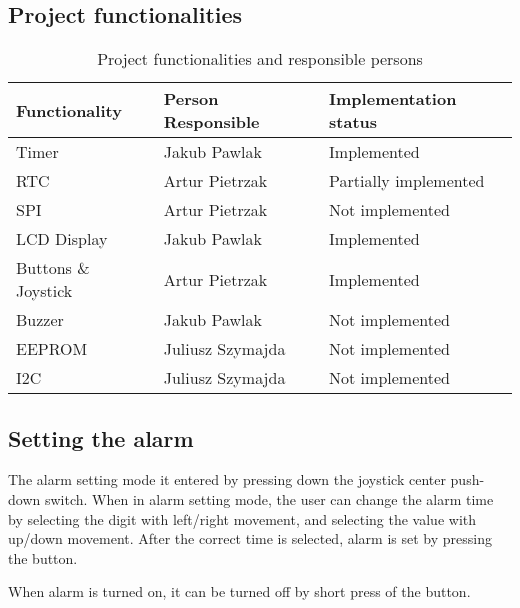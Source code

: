 \documentclass[10pt]{article}
\begin{document}
    \subsection{Project functionalities}
    \begin{table}[H]\centering
        \begin{tabular}{|l|l|l|}
            \hline
            \bf Functionality   & \bf Person Responsible    & \bf Implementation status                     \\ \hline
            Timer               & Jakub Pawlak              & Implemented                                   \\ \hline
            RTC                 & Artur Pietrzak            & \color{orange!80!red} Partially implemented   \\ \hline
            SPI                 & Artur Pietrzak            & \color{red} Not implemented                   \\ \hline
            LCD Display         & Jakub Pawlak              & Implemented                                   \\ \hline
            Buttons \& Joystick & Artur Pietrzak            & Implemented                                   \\ \hline
            Buzzer              & Jakub Pawlak              & \color{red} Not implemented                   \\ \hline
            EEPROM              & Juliusz Szymajda          & \color{red} Not implemented                   \\ \hline
            I2C                 & Juliusz Szymajda          & \color{red} Not implemented                   \\ \hline
        \end{tabular}
        \caption{Project functionalities and responsible persons}
    \end{table}

    \subsection{Setting the alarm}
    The alarm setting mode it entered by pressing down the joystick center push-down switch.
    When in alarm setting mode, the user can change the alarm time by selecting the digit with left/right movement, and selecting the value with up/down movement.
    After the correct time is selected, alarm is set by pressing the button.

    When alarm is turned on, it can be turned off by short press of the button.
\end{document}
